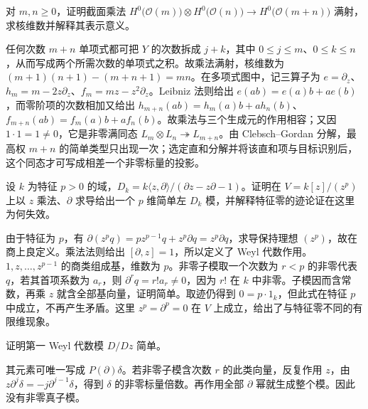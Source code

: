 \begin{exercise}\label{b5:ex:C-line-bundle-product}
	对 \(m,n\ge0\)，证明截面乘法 \(H^0\bigl(\mathcal O(m)\bigr)\otimes H^0\bigl(\mathcal O(n)\bigr)\to H^0\bigl(\mathcal O(m+n)\bigr)\) 满射，求核维数并解释其表示意义。
\end{exercise}
\begin{solution}
	任何次数 \(m+n\) 单项式都可把 \(Y\) 的次数拆成 \(j+k\)，其中 \(0\le j\le m\)、\(0\le k\le n\)，从而写成两个所需次数的单项式之积。故乘法满射，核维数为 \((m+1)(n+1)-(m+n+1)=mn\)。在多项式图中，记三算子为 \(e=\partial_z\)、\(h_m=m-2z\partial_z\)、\(f_m=mz-z^2\partial_z\)。Leibniz 法则给出 \(e(ab)=e(a)b+ae(b)\)，而零阶项的次数相加又给出 \(h_{m+n}(ab)=h_m(a)b+ah_n(b)\)、\(f_{m+n}(ab)=f_m(a)b+af_n(b)\)。故乘法与三个生成元的作用相容；又因 \(1\cdot1=1\ne0\)，它是非零满同态 \(L_m\otimes L_n\twoheadrightarrow L_{m+n}\)。由 Clebsch--Gordan 分解，最高权 \(m+n\) 的简单类型只出现一次；选定直和分解并将该直和项与目标识别后，这个同态才可写成相差一个非零标量的投影。
\end{solution}

\begin{exercise}\label{b5:ex:C-weyl-no-finite-modules}
	设 \(k\) 为特征 \(p>0\) 的域，\(D_k=k\langle z,\partial\rangle/(\partial z-z\partial-1)\)。证明在 \(V=k[z]/(z^p)\) 上以 \(z\) 乘法、\(\partial\) 求导给出一个 \(p\) 维简单左 \(D_k\) 模，并解释特征零的迹论证在这里为何失效。
\end{exercise}
\begin{solution}
	由于特征为 \(p\)，有 \(\partial(z^pq)=pz^{p-1}q+z^p\partial q=z^p\partial q\)，求导保持理想 \((z^p)\)，故在商上良定义。乘法法则给出 \([\partial,z]=1\)，所以定义了 Weyl 代数作用。\(1,z,\ldots,z^{p-1}\) 的商类组成基，维数为 \(p\)。非零子模取一个次数为 \(r<p\) 的非零代表 \(q\)，若其首项系数为 \(a_r\)，则 \(\partial^rq=r!a_r\ne0\)，因为 \(r!\) 在 \(k\) 中非零。子模因而含常数，再乘 \(z\) 就含全部基向量，证明简单。取迹仍得到 \(0=p\cdot1_k\)，但此式在特征 \(p\) 中成立，不再产生矛盾。这里 \(z^p=\partial^p=0\) 在 \(V\) 上成立，给出了与特征零不同的有限维现象。
\end{solution}

\begin{exercise}\label{b5:ex:C-delta-simple}
	证明第一 Weyl 代数模 \(D/Dz\) 简单。
\end{exercise}
\begin{solution}
	其元素可唯一写成 \(P(\partial)\delta\)。若非零子模含次数 \(r\) 的此类向量，反复作用 \(z\)，由 \(z\partial^j\delta=-j\partial^{j-1}\delta\)，得到 \(\delta\) 的非零标量倍数。再作用全部 \(\partial\) 幂就生成整个模。因此没有非零真子模。
\end{solution}

